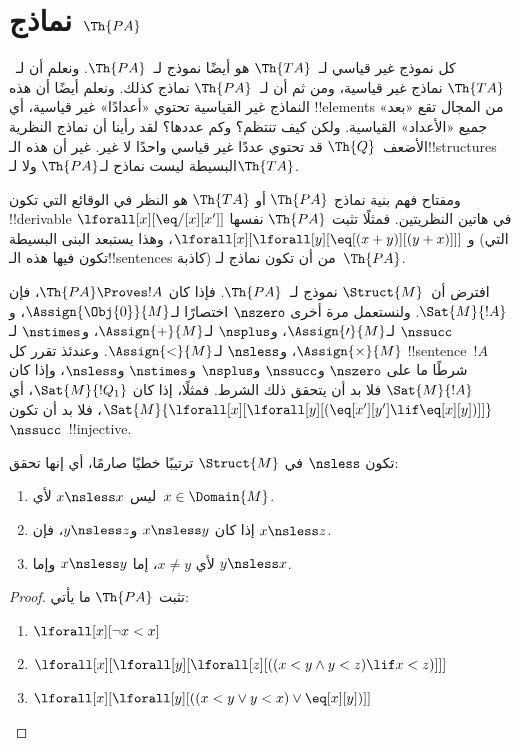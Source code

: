\documentclass[../../../include/open-logic-section]{subfiles}
\begin{document}
\section{نماذج $\Th{PA}$}

\begin{explain}
كل نموذج غير قياسي لـ~$\Th{TA}$ هو أيضًا نموذج لـ~$\Th{PA}$. ونعلم أن
لـ~$\Th{TA}$ نماذج غير قياسية، ومن ثم أن لـ~$\Th{PA}$ نماذج كذلك. ونعلم
أيضًا أن هذه النماذج غير القياسية تحتوي «أعدادًا» غير قياسية، أي
!!{element}s من المجال تقع «بعد» جميع «الأعداد» القياسية. ولكن كيف
تنتظم؟ وكم عددها؟ لقد رأينا أن نماذج النظرية الأضعف~$\Th{Q}$ قد تحتوي
عددًا غير قياسي واحدًا لا غير. غير أن هذه الـ!!{structure}s البسيطة ليست
نماذج لـ$\Th{PA}$ ولا لـ$\Th{TA}$.

ومفتاح فهم بنية نماذج $\Th{PA}$ أو $\Th{TA}$ هو النظر في الوقائع التي
تكون !!{derivable} في هاتين النظريتين. فمثلًا تثبت $\Th{PA}$ نفسها
$\lforall[x][\eq/[x][x']]$ و
$\lforall[x][\lforall[y][\eq[(x+y)][(y+x)]]]$، وهذا يستبعد البنى البسيطة
(التي تكون فيها هذه الـ!!{sentence}s كاذبة) من أن تكون نماذج لـ~$\Th{PA}$.

افترض أن~$\Struct{M}$ نموذج لـ~$\Th{PA}$. فإذا كان
$\Th{PA} \Proves !A$، فإن $\Sat{M}{!A}$. ولنستعمل مرة أخرى $\nszero$
اختصارًا لـ$\Assign{\Obj{0}}{M}$، و$\nssucc$ لـ$\Assign{\prime}{M}$،
و$\nsplus$ لـ$\Assign{+}{M}$، و$\nstimes$ لـ$\Assign{\times}{M}$،
و$\nsless$ لـ$\Assign{<}{M}$. وعندئذ تقرر كل !!{sentence}~$!A$ شرطًا ما
على $\nszero$ و$\nssucc$ و$\nsplus$ و$\nstimes$ و$\nsless$، وإذا كان
$\Sat{M}{!A}$ فلا بد أن يتحقق ذلك الشرط. فمثلًا، إذا كان
$\Sat{M}{!Q_1}$، أي
$\Sat{M}{\lforall[x][\lforall[y][(\eq[x'][y'] \lif \eq[x][y])]]}$،
فلا بد أن تكون $\nssucc$~!!{injective}.
\end{explain}

\begin{prop}
تكون $\nsless$ في $\Struct{M}$ ترتيبًا خطيًا صارمًا، أي إنها تحقق:
\begin{enumerate}
\item ليس $x \nsless x$ لأي~$x \in \Domain{M}$.
\item إذا كان $x \nsless y$ و$y \nsless z$، فإن $x \nsless z$.
\item لأي $x \neq y$، إما $x \nsless y$ وإما $y \nsless x$.
\end{enumerate}
\end{prop}

\begin{proof}
تثبت $\Th{PA}$ ما يأتي:
\begin{enumerate}
\item $\lforall[x][\lnot x < x]$
\item $\lforall[x][\lforall[y][\lforall[z][((x < y \land y < z) \lif x < z)]]]$
\item $\lforall[x][\lforall[y][((x < y \lor y < x) \lor \eq[x][y])]]$
\end{enumerate}
\end{proof}
\end{document}
